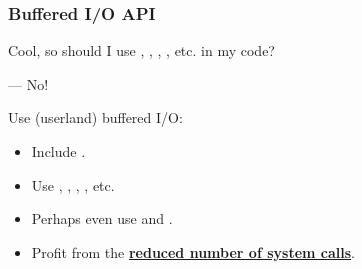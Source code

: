 \begin{frame}

\frametitle{Buffered I/O API}

\begin{center}

\bfseries

Cool, so should I use , , ,
, etc. in my code?

\end{center}

\pause

\begin{flushright}

--- No!

\end{flushright}

\vspace{\fill}

Use (userland) buffered I/O:

\begin{itemize}

\item Include .

\item Use , , , , etc.

\item Perhaps even use  and .

\item Profit from the \textbf{\underline{reduced number of system calls}}.

\end{itemize}

\end{frame}
